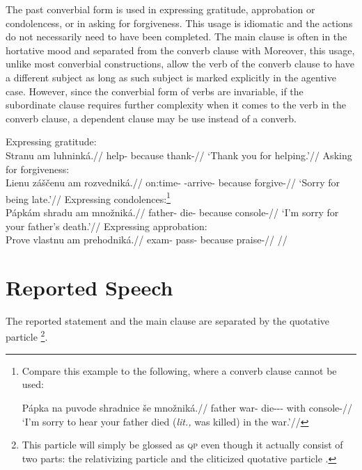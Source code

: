 The past converbial form is used in expressing gratitude, approbation or condolencess, or in asking for forgiveness. This usage is idiomatic and the actions do not necessarily need to have been completed. The main clause is often in the hortative mood and separated from the converb clause with  Moreover, this usage, unlike most converbial constructions, allow the verb of the converb clause to have a different subject as long as such subject is marked explicitly in the agentive case. However, since the converbial form of verbs are invariable, if the subordinate clause requires further complexity when it comes to the verb in the converb clause, a dependent  clause may be use instead of a converb.

\pex
\a Expressing gratitude:\\
\begingl
\gla Stranu am luhninká.//
\glb help- because thank-//
\glft `Thank you for helping.'//
\endgl
\a Asking for forgiveness:\\
\begingl
\gla Lienu záščenu am rozvedniká.//
\glb on:time-\Ins{} \Neg{}-arrive- because forgive-//
\glft `Sorry for being late.'//
\endgl
\a Expressing condolences:\footnote{Compare this example to the following, where a converb clause cannot be used:

\ex[lingstyle=fnex,belowexskip=-1em]
\begingl
\gla Pápka na puvode shradnice še množniká.//
\glb father \Loc{} war-\Pat{} die-\Pv{}-\Pf{}-\Quot{} with console-//
\glft `I'm sorry to hear your father died (\emph{lit.,} was killed) in the war.'//
\endgl\xe}\\
\begingl
\gla Pápkám shradu am množniká.//
\glb father- die- because console-//
\glft `I'm sorry for your father's death.'//
\endgl
\a Expressing approbation:\\
\begingl
\gla Prove vlastnu am prehodniká.//
\glb exam-\Pat{} pass- because praise-//
\glft {}//
\endgl
\xe


\section{Reported Speech}\label{sec:reportedspeech}

The reported statement and the main clause are separated by the quotative particle \footnote{This particle will simply be glossed as {\scshape qp} even though it actually consist of two parts: the relativizing particle  and the cliticized quotative particle .}.

